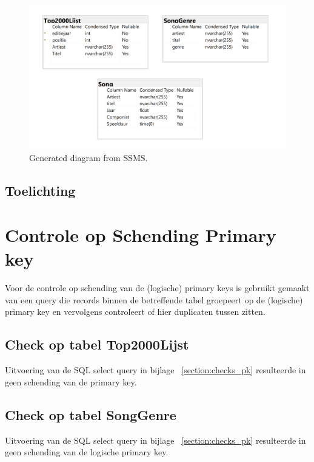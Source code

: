 \documentclass{report}
\begin{document}
                \begin{figure}
                    \includegraphics[width=\linewidth]{databasestructuur.png}
                    \caption{Generated diagram from SSMS.}
                    \label{fig:boat1}
                \end{figure}

            \subsection{Toelichting}


        \section{Controle op Schending Primary key}
            Voor de controle op schending van de (logische) primary keys is gebruikt gemaakt van een query 
            die records binnen de betreffende tabel groepeert op de (logische) primary key 
            en vervolgens controleert of hier duplicaten tussen zitten.

            \subsection{Check op tabel Top2000Lijst}
                Uitvoering van de SQL select query in bijlage ~\ref{section:checks_pk} 
                resulteerde in geen schending van de primary key.

            \subsection{Check op tabel SongGenre}
                Uitvoering van de SQL select query in bijlage ~\ref{section:checks_pk} 
                resulteerde in geen schending van de logische primary key.
\end{document}
